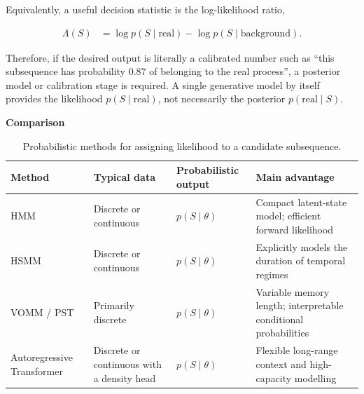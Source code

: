 \documentclass{book}
\providecommand{\ProjectDeepHeading}[2]{%
    \par\medskip\noindent\textbf{#2}\par\smallskip
}
\begin{document}
        \noindent
        Equivalently, a useful decision statistic is the log-likelihood ratio,

        \begin{align}
            \ensuremath{\Lambda}(S)
            &=
            \log p(S\mid\mathrm{real})
            -
            \log p(S\mid\mathrm{background}).
        \end{align}

        \noindent
        Therefore, if the desired output is literally a calibrated number such as ``this subsequence has probability \(0.87\) of belonging to the real process'', a posterior model or calibration stage is required. A single generative model by itself provides the likelihood \(p(S\mid\mathrm{real})\), not necessarily the posterior \(p(\mathrm{real}\mid S)\).

    \ProjectDeepHeading{3}{Comparison}

        \begin{table}[H]
            \centering
            \begin{tabular}{
                >{\raggedright\arraybackslash}p{}
                >{\raggedright\arraybackslash}p{}
                >{\raggedright\arraybackslash}p{}
                >{\raggedright\arraybackslash}p{}
                }
                \toprule
                Method & Typical data & Probabilistic output & Main advantage \\
                \midrule
                HMM
                & Discrete or continuous
                & \(p(S\mid\ensuremath{\theta})\)
                & Compact latent-state model; efficient forward likelihood \\

                HSMM
                & Discrete or continuous
                & \(p(S\mid\ensuremath{\theta})\)
                & Explicitly models the duration of temporal regimes \\

                VOMM / PST
                & Primarily discrete
                & \(p(S\mid\ensuremath{\theta})\)
                & Variable memory length; interpretable conditional probabilities \\

                Autoregressive Transformer
                & Discrete or continuous with a density head
                & \(p(S\mid\ensuremath{\theta})\)
                & Flexible long-range context and high-capacity modelling \\
                \bottomrule
            \end{tabular}
            \caption{Probabilistic methods for assigning likelihood to a candidate subsequence.}
        \end{table}
\end{document}
